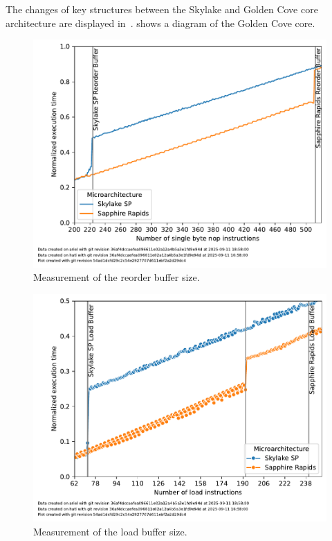 The changes of key structures between the Skylake and Golden Cove core architecture are displayed in~.
 shows a diagram of the Golden Cove core.


\begin{figure}[]
    \centering
    \includegraphics[width=0.8\columnwidth]{fig/robsize/reorder-buffer.pdf}
    \caption{\label{fig:robsize-reorder}Measurement of the reorder buffer size.}
\end{figure}
\begin{figure}[]
    \centering
    \includegraphics[width=0.8\columnwidth]{fig/robsize/load-buffer.pdf}
    \caption{\label{fig:robsize-load}Measurement of the load buffer size.}
\end{figure}
